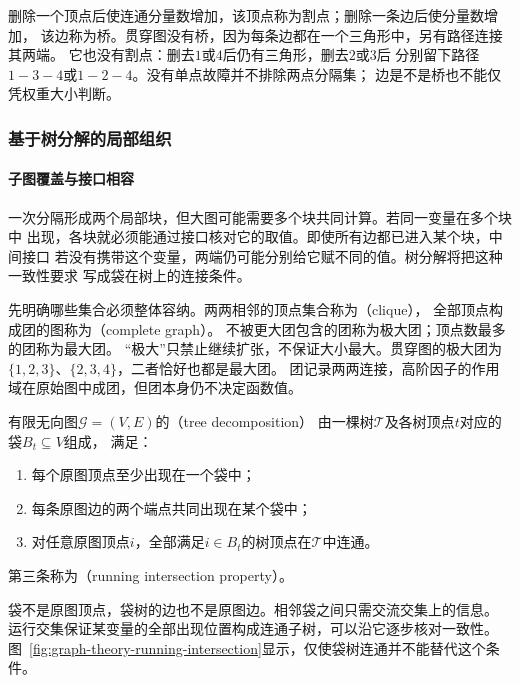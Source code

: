 删除一个顶点后使连通分量数增加，该顶点称为割点；删除一条边后使分量数增加，
该边称为桥。贯穿图没有桥，因为每条边都在一个三角形中，另有路径连接其两端。
它也没有割点：删去\(1\)或\(4\)后仍有三角形，删去\(2\)或\(3\)后
分别留下路径\(1-3-4\)或\(1-2-4\)。没有单点故障并不排除两点分隔集；
边是不是桥也不能仅凭权重大小判断。

\subsubsection{基于树分解的局部组织}
\label{sec:graph-theory-tree-decomposition}

\paragraph{子图覆盖与接口相容}

一次分隔形成两个局部块，但大图可能需要多个块共同计算。若同一变量在多个块中
出现，各块就必须能通过接口核对它的取值。即使所有边都已进入某个块，中间接口
若没有携带这个变量，两端仍可能分别给它赋不同的值。树分解将把这种一致性要求
写成袋在树上的连接条件。

先明确哪些集合必须整体容纳。两两相邻的顶点集合称为（clique），
全部顶点构成团的图称为（complete graph）。
不被更大团包含的团称为极大团；顶点数最多的团称为最大团。
“极大”只禁止继续扩张，不保证大小最大。贯穿图的极大团为
\(\{1,2,3\}\)、\(\{2,3,4\}\)，二者恰好也都是最大团。
团记录两两连接，高阶因子的作用域在原始图中成团，但团本身仍不决定函数值。

\begin{definition}[树分解]
  \label{def:graph-theory-tree-decomposition}
  有限无向图\(\mathcal G=(V,E)\)的（tree decomposition）
  由一棵树\(\mathcal T\)及各树顶点\(t\)对应的袋\(B_t\subseteq V\)组成，
  满足：
  \begin{enumerate}
    \item 每个原图顶点至少出现在一个袋中；
    \item 每条原图边的两个端点共同出现在某个袋中；
    \item 对任意原图顶点\(i\)，全部满足\(i\in B_t\)的树顶点在\(\mathcal T\)中连通。
  \end{enumerate}
  第三条称为（running intersection property）。
\end{definition}

袋不是原图顶点，袋树的边也不是原图边。相邻袋之间只需交流交集上的信息。
运行交集保证某变量的全部出现位置构成连通子树，可以沿它逐步核对一致性。
图~\ref{fig:graph-theory-running-intersection}显示，仅使袋树连通并不能替代这个条件。

